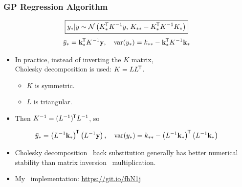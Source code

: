 \begin{frame} \frametitle{GP Regression Algorithm}
\begin{equation}
  \boxed{ y_*|y \sim \mathcal{N}\left(K_*^{\mkern-1.5mu\mathsf{T}} K^{-1}y,\,K_{**}-K_*^{\mkern-1.5mu\mathsf{T}} K^{-1}K_*\right) }
\end{equation}
\begin{equation}
  \bar{y}_* = \mathbf{k}_*^{\mkern-1.5mu\mathsf{T}} K^{-1} \mathbf{y}, \quad
  \mathrm{var}(y_*) = k_{**} - \mathbf{k}_*^{\mkern-1.5mu\mathsf{T}} K^{-1} \mathbf{k}_*
\end{equation}
\vspace{-3mm}
\begin{itemize}
  \item In practice, instead of inverting the $K$ matrix, \\
    Cholesky decomposition is used: $K = LL^{\mkern-1.5mu\mathsf{T}}$.
  \begin{itemize}
    \item $K$ is symmetric.
    \item $L$ is triangular.
  \end{itemize}
  \vspace{1mm}
  \item Then $K^{-1} = (L^{-1})^{\mkern-1.5mu\mathsf{T}} L^{-1}$, so
\end{itemize}
\begin{equation}
  \bar{y}_* = \left(L^{-1}\mathbf{k}_*\right)^{\mkern-1.5mu\mathsf{T}} \left(L^{-1} \mathbf{y}\right),
  \quad
  \mathrm{var}(y_*) = k_{**} -
    \left(L^{-1}\mathbf{k}_*\right)^{\mkern-1.5mu\mathsf{T}}
    \left(L^{-1}\mathbf{k}_*\right)
\end{equation}
\vspace{-5mm}
\begin{itemize}
  \item Cholesky decomposition \plus\ back substitution generally has better
    numerical stability than matrix inversion \plus\ multiplication.
  \vspace{1mm}
  \item My \cpp\ implementation:
    {\small\url{https://git.io/fhN1j}}
\end{itemize}
\end{frame}

